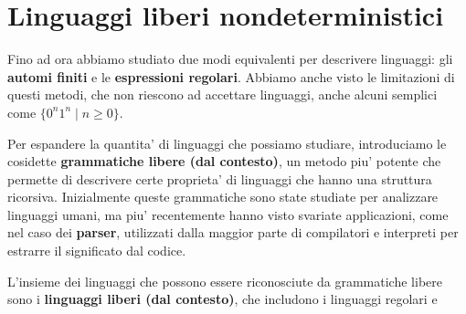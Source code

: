 \chapter{Linguaggi liberi nondeterministici}
Fino ad ora abbiamo studiato due modi equivalenti per descrivere linguaggi: gli \textbf{automi finiti} e le \textbf{espressioni regolari}. Abbiamo anche visto le limitazioni di questi metodi, che non riescono ad accettare linguaggi, anche alcuni semplici come $ \{0^n 1^n \mid n \geq 0\} $. 

Per espandere la quantita' di linguaggi che possiamo studiare, introduciamo le cosidette \textbf{grammatiche libere (dal contesto)}, un metodo piu' potente che permette di descrivere certe proprieta' di linguaggi che hanno una struttura ricorsiva. Inizialmente queste grammatiche sono state studiate per analizzare linguaggi umani, ma piu' recentemente hanno visto svariate applicazioni, come nel caso dei \textbf{parser}, utilizzati dalla maggior parte di compilatori e interpreti per estrarre il significato dal codice. 

L'insieme dei linguaggi che possono essere riconosciute da grammatiche libere sono i \textbf{linguaggi liberi (dal contesto)}, che includono i linguaggi regolari e 
